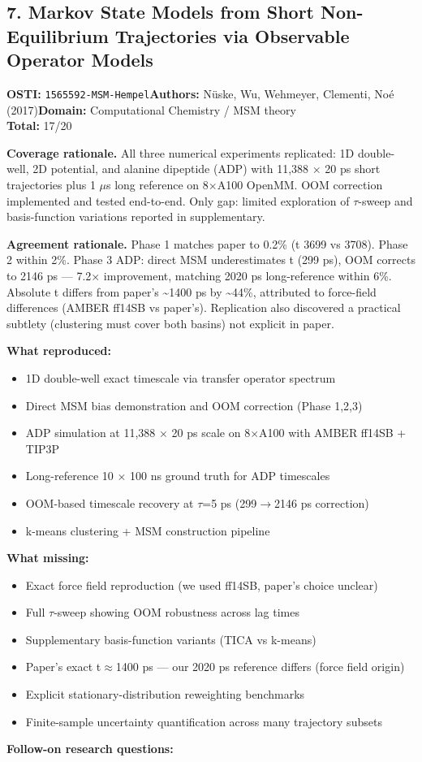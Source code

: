 \subsection{7. Markov State Models from Short Non-Equilibrium Trajectories via Observable Operator Models}
\textbf{OSTI:} \texttt{1565592-MSM-Hempel}\quad\textbf{Authors:} N\"uske, Wu, Wehmeyer, Clementi, No\'e (2017)\quad\textbf{Domain:} Computational Chemistry / MSM theory\\
\quad{}\quad\textbf{Total:} 17/20\par\smallskip
\noindent\textbf{Coverage rationale.} All three numerical experiments replicated: 1D double-well, 2D potential, and alanine dipeptide (ADP) with 11,388 $\times$ 20 ps short trajectories plus 1 $\mu$s long reference on 8$\times$A100 OpenMM. OOM correction implemented and tested end-to-end. Only gap: limited exploration of $\tau$-sweep and basis-function variations reported in supplementary.\par
\noindent\textbf{Agreement rationale.} Phase 1 matches paper to 0.2\% (t 3699 vs 3708). Phase 2 within 2\%. Phase 3 ADP: direct MSM underestimates t (299 ps), OOM corrects to 2146 ps --- 7.2$\times$ improvement, matching 2020 ps long-reference within 6\%. Absolute t differs from paper's \textasciitilde{}1400 ps by \textasciitilde{}44\%, attributed to force-field differences (AMBER ff14SB vs paper's). Replication also discovered a practical subtlety (clustering must cover both basins) not explicit in paper.\par\smallskip
\noindent\textbf{What reproduced:}
\begin{itemize}[leftmargin=1.4em,itemsep=0.2em,topsep=0.2em]
\item 1D double-well exact timescale via transfer operator spectrum
\item Direct MSM bias demonstration and OOM correction (Phase 1,2,3)
\item ADP simulation at 11,388 $\times$ 20 ps scale on 8$\times$A100 with AMBER ff14SB + TIP3P
\item Long-reference 10 $\times$ 100 ns ground truth for ADP timescales
\item OOM-based timescale recovery at $\tau$=5 ps (299$\rightarrow$2146 ps correction)
\item k-means clustering + MSM construction pipeline
\end{itemize}\noindent\textbf{What missing:}
\begin{itemize}[leftmargin=1.4em,itemsep=0.2em,topsep=0.2em]
\item Exact force field reproduction (we used ff14SB, paper's choice unclear)
\item Full $\tau$-sweep showing OOM robustness across lag times
\item Supplementary basis-function variants (TICA vs k-means)
\item Paper's exact t$\approx$1400 ps --- our 2020 ps reference differs (force field origin)
\item Explicit stationary-distribution reweighting benchmarks
\item Finite-sample uncertainty quantification across many trajectory subsets
\end{itemize}\noindent\textbf{Follow-on research questions:}
